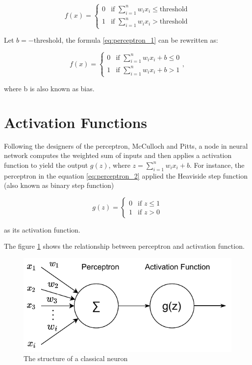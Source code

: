 \documentclass[
	parskip, 			   %
	twoside, 			   %
	DIV=14, 			   %
	BCOR=15.0mm, 		   %
	headsepline, 		   %
	open=right, 		   %
	captions=tableheading, %
	bibliography=totoc,    %
	numbers=noenddot       %
]{scrreprt}
\begin{document}
\begin{equation}
    \label{eq:perceptron_1}
    f(x)=\begin{cases}0 & \text{if } \sum\nolimits_{i=1}^n w_{i} x_{i} \leq \text{threshold} \\ 1 & \text{if } \sum\nolimits_{i=1}^n w_{i} x_{i}>\text{threshold}\end{cases}
\end{equation}

Let $b=-\text{threshold}$, the formula \ref{eq:perceptron_1} can be rewritten as:

\begin{equation}
    \label{eq:perceptron_2}
    f(x)=\begin{cases}0 & \text{if } \sum\nolimits_{i=1}^n w_{i} x_{i}+b \leq 0 \\ 1 & \text{if } \sum\nolimits_{i=1}^n w_{i} x_{i}+b>1\end{cases},
\end{equation}

where b is also known as bias. 

\section{Activation Functions}
Following the designers of the perceptron, McCulloch and Pitts, a node in neural network computes the weighted sum of inputs and then applies a activation function to yield the output $g(z)$, where $z=\sum\nolimits_{i=1}^n w_{i} x_{i} + b$. For instance, the perceptron in the equation \ref{eq:perceptron_2} applied the Heaviside step function (also known as binary step function) 

\begin{equation}
    \label{eq:activation_function}
    g(z)=\begin{cases} 0 & \text{if } z\leq 1 \\ 1  & \text{if } z>0
    \end{cases}
\end{equation}

as its activation function.

The figure \ref{fig:neuron_structure} shows the relationship between perceptron and activation function.

\begin{figure}[h!]
    \centering
    \includegraphics[scale=1]{figures/activation_function.pdf}
    \caption{The structure of a classical neuron}
    \label{fig:neuron_structure}
\end{figure}
\end{document}

